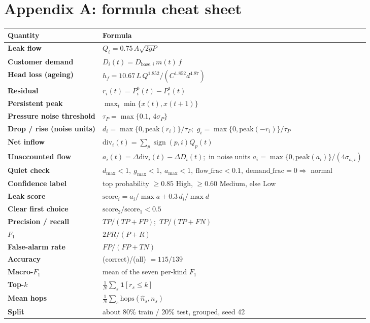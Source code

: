 \documentclass[11pt,a4paper]{article}
\begin{document}
\newpage
\section*{Appendix A: formula cheat sheet}
\begin{center}\small\begin{tabularx}{\linewidth}{@{}>{\bfseries}p{3.3cm}Y@{}}\toprule
Quantity & Formula \\\midrule
Leak flow & $Q_\ell=0.75\,A\sqrt{2gP}$ \\
Customer demand & $D_i(t)=D_{\text{base},i}\,m(t)\,f$ \\
Head loss (ageing) & $h_f=10.67\,L\,Q^{1.852}/(C^{1.852}d^{4.87})$ \\
Residual & $r_i(t)=P^0_i(t)-P^1_i(t)$ \\
Persistent peak & $\max_t\min\{x(t),x(t{+}1)\}$ \\
Pressure noise threshold & $\tau_P=\max\{0.1,\,4\sigma_P\}$ \\
Drop / rise (noise units) & $d_i=\max\{0,\text{peak}(r_i)\}/\tau_P$;\ $g_i=\max\{0,\text{peak}(-r_i)\}/\tau_P$ \\
Net inflow & $\text{div}_i(t)=\sum_p\operatorname{sign}(p,i)Q_p(t)$ \\
Unaccounted flow & $a_i(t)=\Delta\text{div}_i(t)-\Delta D_i(t)$;\ in noise units $a_i=\max\{0,\text{peak}(a_i)\}/(4\sigma_{a,i})$ \\
Quiet check & $d_{\max}<1,\ g_{\max}<1,\ a_{\max}<1,\ \text{flow\_frac}<0.1,\ \text{demand\_frac}=0\Rightarrow$ normal \\
Confidence label & top probability $\ge0.85$ High, $\ge0.60$ Medium, else Low \\
Leak score & $\text{score}_i=a_i/\max a+0.3\,d_i/\max d$ \\
Clear first choice & $\text{score}_2/\text{score}_1<0.5$ \\
Precision / recall & $TP/(TP+FP)$;\ $TP/(TP+FN)$ \\
$F_1$ & $2PR/(P+R)$ \\
False-alarm rate & $FP/(FP+TN)$ \\
Accuracy & (correct)/(all) $=115/139$ \\
Macro-$F_1$ & mean of the seven per-kind $F_1$ \\
Top-$k$ & $\frac1N\sum_s\mathbf 1[r_s\le k]$ \\
Mean hops & $\frac1N\sum_s\text{hops}(\hat n_s,n_s)$ \\
Split & about 80\% train / 20\% test, grouped, seed 42 \\\bottomrule\end{tabularx}\end{center}
\end{document}
